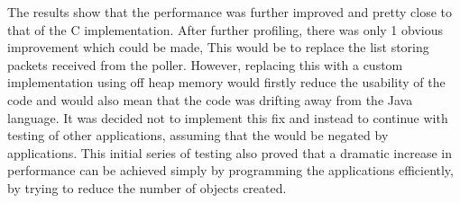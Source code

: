 \documentclass[final_report.tex]{subfiles}
\begin{document}
The results show that the performance was further improved and pretty close to that of the C implementation. After further profiling, there was only 1 obvious improvement which could be made, This would be to replace the list storing packets received from the poller. However, replacing this with a custom implementation using off heap memory would firstly reduce the usability of the code and would also mean that the code was drifting away from the Java language. It was decided not to implement this fix and instead to continue with testing of other applications, assuming that the would be negated by applications. This initial series of testing also proved that a dramatic increase in performance can be achieved simply by programming the applications efficiently, by trying to reduce the number of objects created.

\end{document}
